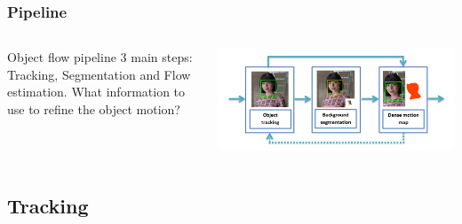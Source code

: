 \documentclass{beamer}
\begin{document}
\begin{frame}
	\frametitle{Pipeline}
  \begin{columns}[T]
    \begin{column}{.5\textwidth}
		\begin{block}{Object flow pipeline}
3 main steps: Tracking, Segmentation and Flow estimation.
What information to use to refine the object motion?	
		\end{block}
    \end{column}
    \begin{column}{.5\textwidth}
		\includegraphics[width=1.0\textwidth]{../images/system.png}
    \end{column}
  \end{columns}
\end{frame}


\subsection{Tracking}
\end{document}
